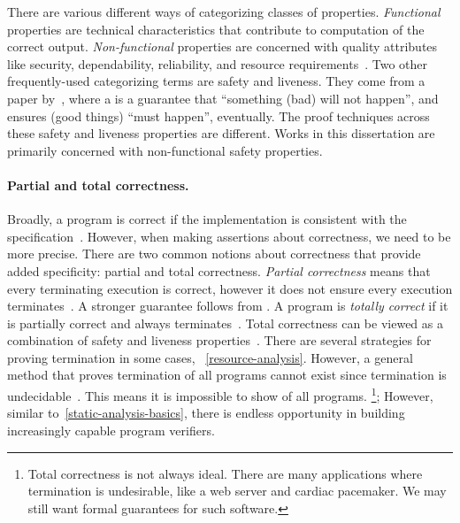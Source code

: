 There are various different ways of categorizing classes of properties.
\emph{Functional} properties are technical characteristics that contribute to computation of the correct output.
\emph{Non-functional} properties are concerned with quality attributes like security, dependability, reliability, and resource requirements~\cite{terbeek2018}.
Two other frequently-used categorizing terms are safety and liveness.
They come from a paper by~\textcite{lamport1977}, where
a \emph{} is a guarantee that \enquote{something (bad) will not happen},
and \emph{} ensures (good things) \enquote{must happen}, eventually.
The proof techniques across these safety and liveness properties are different.
Works in this dissertation are primarily concerned with non-functional safety properties.

\paragraph*{Partial and total correctness.}
Broadly, a program is correct if the implementation is consistent with the specification~\cite{furia2014b}.
However, when making assertions about correctness, we need to be more precise.
There are two common notions about correctness that provide added specificity: partial and total correctness.
\emph{Partial correctness} means that every terminating execution is correct, however it does not ensure every execution terminates~\cite[p. 64]{leino2023}.
A stronger guarantee follows from .
A program is \emph{totally correct} if it is partially correct and always terminates~\cite[p. 64]{leino2023}.
Total correctness can be viewed as a combination of safety and liveness properties~\cite{lamport1977}.
There are several strategies for proving termination in some cases, \cf~\autoref{resource-analysis}.
However, a general method that proves termination of all programs cannot exist since termination is undecidable~\cite{turing1936}.
This means it is impossible to show  of all programs.%
\footnote{Total correctness is not always ideal.
There are many applications where termination is undesirable, like a web server and cardiac pacemaker.
We may still want formal guarantees for such software.};
However, similar to~\autoref{static-analysis-basics}, there is endless opportunity in building increasingly capable program verifiers.

